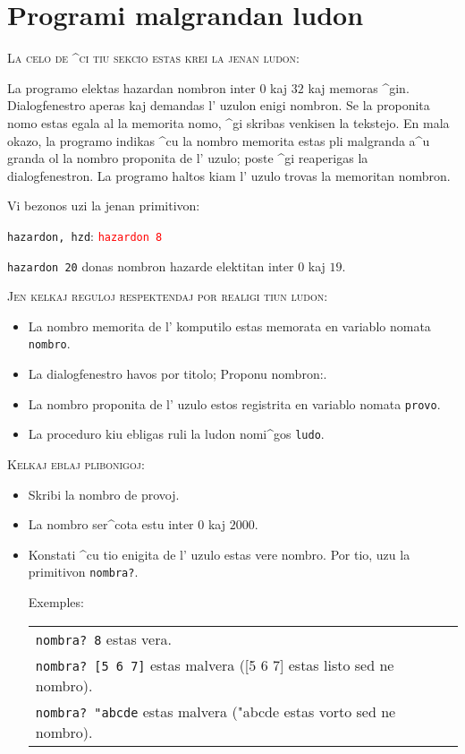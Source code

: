 \section{Programi malgrandan ludon}

\textsc{La celo de ^ci tiu sekcio estas krei la jenan ludon:}

La programo elektas hazardan nombron inter $0$ kaj $32$ kaj memoras
^gin.  Dialogfenestro aperas kaj demandas l' uzulon enigi nombron.  Se
la proponita nomo estas egala al la memorita nomo, ^gi skribas \og
venkis\fg en la tekstejo.  En mala okazo, la programo indikas ^cu la
nombro memorita estas pli malgranda a^u granda ol la nombro proponita
de l' uzulo; poste ^gi reaperigas la dialogfenestron.  La programo
haltos kiam l' uzulo trovas la memoritan nombron.

Vi bezonos uzi la jenan primitivon:

\texttt{hazardon, hzd}: \hspace{4cm} \textcolor{red}{\texttt{hazardon 8}} 

\texttt{hazardon 20} donas nombron hazarde elektitan inter $0$ kaj $19$.

\textsc{Jen kelkaj reguloj respektendaj por realigi tiun ludon:}
\begin{itemize}
\item La nombro memorita de l' komputilo estas memorata en variablo
  nomata \texttt{nombro}.
\item La dialogfenestro havos por titolo; \og Proponu nombron:\fg.
\item La nombro proponita de l' uzulo estos registrita en variablo
  nomata \texttt{provo}.
\item La proceduro kiu ebligas ruli la ludon nomi^gos  \texttt{ludo}.
\end{itemize}

\vspace{0.5cm}
\textsc{Kelkaj eblaj plibonigoj:}
\begin{itemize}
\item Skribi la nombro de provoj.
\item La nombro ser^cota estu inter $0$ kaj $2000$.
\item Konstati ^cu tio enigita de l' uzulo estas vere nombro.  Por
  tio, uzu la primitivon \texttt{nombra?}.

  Exemples: \begin{tabular}[t]{l}
    \texttt{nombra? 8} estas vera.\\
    \texttt{nombra? [5 6 7]} estas malvera ([5 6 7] estas listo sed ne
    nombro).\\
    \texttt{nombra? "abcde} estas malvera ("abcde estas
    vorto sed ne nombro).
\end{tabular}
\end{itemize}
